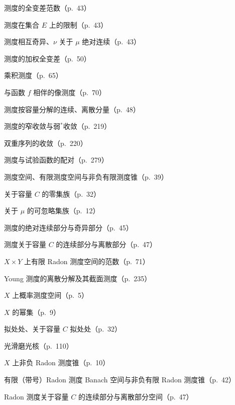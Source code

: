 \documentclass[../main.tex]{subfiles}
\begin{document}
\begin{description}[style=nextline,leftmargin=1.2em,itemsep=1pt,topsep=2pt,font=\normalfont\small]
\item[{$\|\mu\|$}] 测度的全变差范数（p.~43）
\item[{$\mu\lfloor E$}] 测度在集合 $E$ 上的限制（p.~43）
\item[{$\mu\perp\nu,\ \nu\ll\mu$}] 测度相互奇异、$\nu$ 关于 $\mu$ 绝对连续（p.~43）
\item[{$|\mu|_w$}] 测度的加权全变差（p.~50）
\item[{$\mu_1\times\mu_2$}] 乘积测度（p.~65）
\item[{$\mu_f$}] 与函数 $f$ 相伴的像测度（p.~70）
\item[{$(\mu_{c,m,p},\mu_{d,m,p})_1$}] 测度按容量分解的连续、离散分量（p.~48）
\item[{$\mu_k\to\mu,\ \mu_k\stackrel{*}{\rightharpoonup}\mu$}] 测度的窄收敛与弱$^*$收敛（p.~219）
\item[{$\mu_k^n\rightharpoonup\mu$}] 双重序列的收敛（p.~220）
\item[{$\langle\mu,\rho\rangle$}] 测度与试验函数的配对（p.~279）
\item[{$\mathscr{M},\ \mathscr{M}(X),\ \mathscr{M}_f(X),\ \mathscr{M}_f^+(X)$}] 测度空间、有限测度空间与非负有限测度锥（p.~39）
\item[{$\mathcal{N}_C$}] 关于容量 $C$ 的零集族（p.~32）
\item[{$\mathcal{N}_\mu$}] 关于 $\mu$ 的可忽略集族（p.~12）
\item[{$\nu_{\mathrm{ac}},\ \nu_s$}] 测度的绝对连续部分与奇异部分（p.~45）
\item[{$\nu_{C,c},\ \nu_{C,d}$}] 测度关于容量 $C$ 的连续部分与离散部分（p.~47）
\item[{$\|\nu\|_{\mathscr{R}_f(X\times Y)}$}] $X\times Y$ 上有限 Radon 测度空间的范数（p.~71）
\item[{$\{\nu_x\}_{x\in X},\ \nu_x$}] Young 测度的离散分解及其截面测度（p.~235）
\item[{$\mathcal{P}(X)$}] $X$ 上概率测度空间（p.~5）
\item[{$P(X)$}] $X$ 的幂集（p.~9）
\item[{$\mathrm{q.\,e.},\ C\text{-}\mathrm{q.\,e.}$}] 拟处处、关于容量 $C$ 拟处处（p.~32）
\item[{$\rho_\varepsilon$}] 光滑磨光核（p.~110）
\item[{$\mathscr{R}_+(X)$}] $X$ 上非负 Radon 测度锥（p.~10）
\item[{$\mathscr{R}_f(X),\ \mathscr{R}_f^+(X)$}] 有限（带号）Radon 测度 Banach 空间与非负有限 Radon 测度锥（p.~42）
\item[{$\mathscr{R}_{C,c}(X),\ \mathscr{R}_{C,d}(X)$}] Radon 测度关于容量 $C$ 的连续部分与离散部分空间（p.~47）

\end{description}
\end{document}
